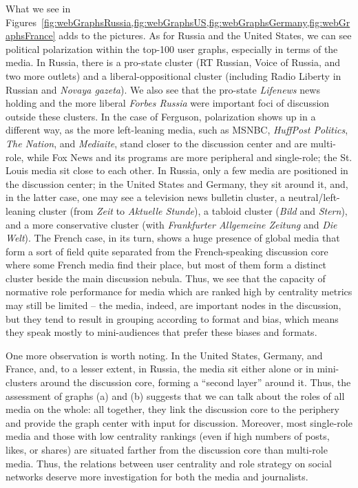 What we see in Figures~\cref{fig:webGraphsRussia,fig:webGraphsUS,fig:webGraphsGermany,fig:webGraphsFrance} adds to the pictures. As for Russia and the United States, we can see political polarization within the top-100 user graphs, especially in terms of the media. In Russia, there is a pro-state cluster (RT Russian, Voice of Russia, and two more outlets) and a liberal-oppositional cluster (including Radio Liberty in Russian and \textit{Novaya gazeta}). We also see that the pro-state \textit{Lifenews} news holding and the more liberal \textit{Forbes Russia} were important foci of discussion outside these clusters. In the case of Ferguson, polarization shows up in a different way, as the more left-leaning media, such as MSNBC, \textit{HuffPost Politics}, \textit{The Nation}, and \textit{Mediaite}, stand closer to the discussion center and are multi-role, while Fox News and its programs are more peripheral and single-role; the St. Louis media sit close to each other. In Russia, only a few media are positioned in the discussion center; in the United States and Germany, they sit around it, and, in the latter case, one may see a television news bulletin cluster, a neutral/left-leaning cluster (from \textit{Zeit} to \textit{Aktuelle Stunde}), a tabloid cluster (\textit{Bild} and \textit{Stern}), and a more conservative cluster (with \textit{Frankfurter Allgemeine Zeitung} and \textit{Die Welt}). The French case, in its turn, shows a huge presence of global media that form a sort of field quite separated from the French-speaking discussion core where some French media find their place, but most of them form a distinct cluster beside the main discussion nebula. Thus, we see that the capacity of normative role performance for media which are ranked high by centrality metrics may still be limited -- the media, indeed, are important nodes in the discussion, but they tend to result in grouping according to format and bias, which means they speak mostly to mini-audiences that prefer these biases and formats.

One more observation is worth noting. In the United States, Germany, and France, and, to a lesser extent, in Russia, the media sit either alone or in mini-clusters around the discussion core, forming a “second layer” around it. Thus, the assessment of graphs (a) and (b) suggests that we can talk about the roles of all media on the whole: all together, they link the discussion core to the periphery and provide the graph center with input for discussion. Moreover, most single-role media and those with low centrality rankings (even if high numbers of posts, likes, or shares) are situated farther from the discussion core than multi-role media. Thus, the relations between user centrality and role strategy on social networks deserve more investigation for both the media and journalists.

